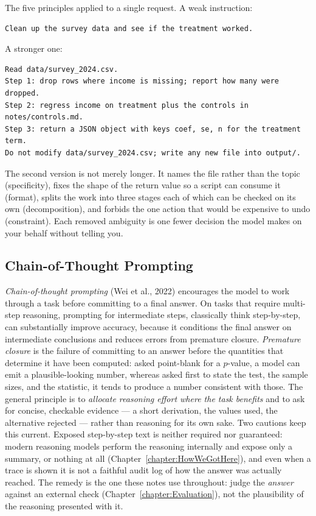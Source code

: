 \begin{example}
The five principles applied to a single request.
A weak instruction:
\begin{lstlisting}
Clean up the survey data and see if the treatment worked.
\end{lstlisting}
A stronger one:
\begin{lstlisting}
Read data/survey_2024.csv.
Step 1: drop rows where income is missing; report how many were dropped.
Step 2: regress income on treatment plus the controls in notes/controls.md.
Step 3: return a JSON object with keys coef, se, n for the treatment term.
Do not modify data/survey_2024.csv; write any new file into output/.
\end{lstlisting}
The second version is not merely longer.
It names the file rather than the topic (specificity), fixes the shape of the return value so a script can consume it (format), splits the work into three stages each of which can be checked on its own (decomposition), and forbids the one action that would be expensive to undo (constraint).
Each removed ambiguity is one fewer decision the model makes on your behalf without telling you.
\end{example}

\subsection{Chain-of-Thought Prompting}

\emph{Chain-of-thought prompting} (Wei et al., 2022) encourages the model to work through a task before committing to a final answer.
On tasks that require multi-step reasoning, prompting for intermediate steps, classically think step-by-step, can substantially improve accuracy, because it conditions the final answer on intermediate conclusions and reduces errors from premature closure.
\emph{Premature closure} is the failure of committing to an answer before the quantities that determine it have been computed: asked point-blank for a $p$-value, a model can emit a plausible-looking number, whereas asked first to state the test, the sample sizes, and the statistic, it tends to produce a number consistent with those.
The general principle is to \emph{allocate reasoning effort where the task benefits} and to ask for concise, checkable evidence --- a short derivation, the values used, the alternative rejected --- rather than reasoning for its own sake.
Two cautions keep this current.
Exposed step-by-step text is neither required nor guaranteed: modern reasoning models perform the reasoning internally and expose only a summary, or nothing at all (Chapter~\ref{chapter:HowWeGotHere}), and even when a trace is shown it is not a faithful audit log of how the answer was actually reached.
The remedy is the one these notes use throughout: judge the \emph{answer} against an external check (Chapter~\ref{chapter:Evaluation}), not the plausibility of the reasoning presented with it.

